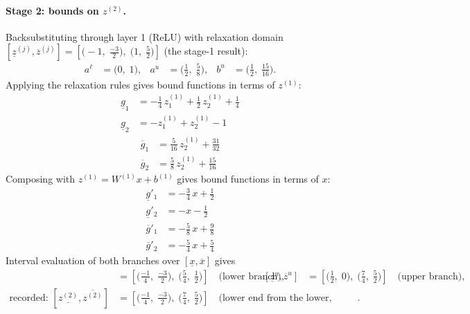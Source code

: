 \documentclass[11pt]{article}
\begin{document}
\paragraph{Stage 2: bounds on $z^{(2)}$.}
Backsubstituting through layer 1 (ReLU) with relaxation domain $[\underline{z}^{(j)}, \overline{z}^{(j)}] = [\bigl(-1,\; \frac{-3}{2}\bigr),\; \bigl(1,\; \frac{5}{2}\bigr)]$ (the stage-1 result):
\begin{align*}
a^{\ell} &= \bigl(0,\; 1\bigr), & a^{u} &= \bigl(\frac{1}{2},\; \frac{5}{8}\bigr), & b^{u} &= \bigl(\frac{1}{2},\; \frac{15}{16}\bigr).
\end{align*}
Applying the relaxation rules gives bound functions in terms of $z^{(1)}$:
\begin{align*}
\underline{g}_{1} &= -\frac{1}{4}\,z^{(1)}_{1} + \frac{1}{2}\,z^{(1)}_{2} + \frac{1}{4} \\
\underline{g}_{2} &= -z^{(1)}_{1} + z^{(1)}_{2} - 1
\end{align*}
\begin{align*}
\overline{g}_{1} &= \frac{5}{16}\,z^{(1)}_{2} + \frac{31}{32} \\
\overline{g}_{2} &= \frac{5}{8}\,z^{(1)}_{2} + \frac{15}{16}
\end{align*}
Composing with $z^{(1)} = W^{(1)} x + b^{(1)}$ gives bound functions in terms of $x$:
\begin{align*}
\underline{g}'_{1} &= -\frac{3}{4}\,x + \frac{1}{2} \\
\underline{g}'_{2} &= -x - \frac{1}{2}
\end{align*}
\begin{align*}
\overline{g}'_{1} &= -\frac{5}{8}\,x + \frac{9}{8} \\
\overline{g}'_{2} &= -\frac{5}{4}\,x + \frac{5}{4}
\end{align*}
Interval evaluation of both branches over $[\underline{x}, \overline{x}]$ gives
\begin{align*}
[\underline{z}^{\ell}, \overline{z}^{\ell}] &= [\bigl(\frac{-1}{4},\; \frac{-3}{2}\bigr),\; \bigl(\frac{5}{4},\; \frac{1}{2}\bigr)] \quad\text{(lower branch)}, & [\underline{z}^{u}, \overline{z}^{u}] &= [\bigl(\frac{1}{2},\; 0\bigr),\; \bigl(\frac{7}{4},\; \frac{5}{2}\bigr)] \quad\text{(upper branch)}, \\
\text{recorded: } [\underline{z^{(2)}}, \overline{z^{(2)}}] &= [\bigl(\frac{-1}{4},\; \frac{-3}{2}\bigr),\; \bigl(\frac{7}{4},\; \frac{5}{2}\bigr)] \quad\text{(lower end from the lower, upper end from the upper branch)}.
\end{align*}
\end{document}

